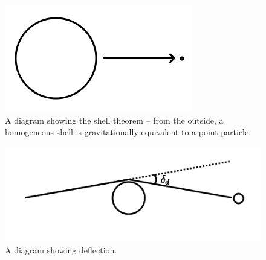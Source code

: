 \documentclass[12pt]{article}
\begin{document}
\begin{figure} 
\centering
\label{fig2}
  \includegraphics[width = 6 in]{shell_theorem.png}
  \caption{ A diagram showing the shell theorem -- from the outside, a homogeneous shell is gravitationally equivalent to a point particle.
}
\end{figure}


\begin{figure} 
\centering
\label{fig3}
  \includegraphics[width = 6 in]{deflection.png}
  \caption{ A diagram showing deflection.
}
\end{figure}
\end{document}
